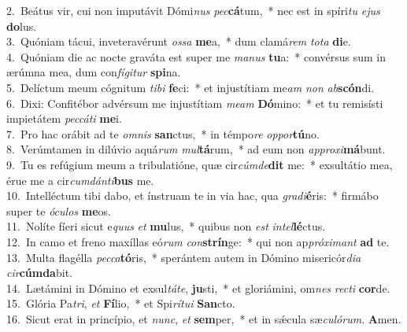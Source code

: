 {2.~}Beátus vir, cui non imputávit Dómi\textit{nus} \textit{pec}\textbf{cá}tum,~* nec est in spíri\textit{tu} \textit{e}\textit{jus} \textbf{do}lus.\\
{3.~}Quóniam tácui, inveteravérunt \textit{os}\textit{sa} \textbf{me}a,~* dum clamá\textit{rem} \textit{to}\textit{ta} \textbf{di}e.\\
{4.~}Quóniam die ac nocte graváta est super me \textit{ma}\textit{nus} \textbf{tu}a:~* convérsus sum in ærúmna mea, dum con\textit{fí}\textit{gi}\textit{tur} \textbf{spi}na.\\
{5.~}Delíctum meum cógnitum \textit{ti}\textit{bi} \textbf{fe}ci:~* et injustítiam me\textit{am} \textit{non} \textit{ab}\textbf{scón}di.\\
{6.~}Dixi: Confitébor advérsum me injustítiam \textit{me}\textit{am} \textbf{Dó}mino:~* et tu remisísti impietátem \textit{pec}\textit{cá}\textit{ti} \textbf{me}i.\\
{7.~}Pro hac orábit ad te \textit{om}\textit{nis} \textbf{san}ctus,~* in témpo\textit{re} \textit{op}\textit{por}\textbf{tú}no.\\
{8.~}Verúmtamen in dilúvio aquá\textit{rum} \textit{mul}\textbf{tá}rum,~* ad eum non \textit{ap}\textit{pro}\textit{xi}\textbf{má}bunt.\\
{9.~}Tu es refúgium meum a tribulatióne, quæ cir\textit{cúm}\textit{de}\textbf{dit} me:~* exsultátio mea, érue me a cir\textit{cum}\textit{dán}\textit{ti}\textbf{bus} me.\\
{10.~}Intelléctum tibi dabo, et ínstruam te in via hac, qua \textit{gra}\textit{di}\textbf{é}ris:~* firmábo super te \textit{ó}\textit{cu}\textit{los} \textbf{me}os.\\
{11.~}Nolíte fíeri sicut e\textit{quus} \textit{et} \textbf{mu}lus,~* quibus non \textit{est} \textit{in}\textit{tel}\textbf{lé}ctus.\\
{12.~}In camo et freno maxíllas eó\textit{rum} \textit{con}\textbf{strín}ge:~* qui non ap\textit{pró}\textit{xi}\textit{mant} \textbf{ad} te.\\
{13.~}Multa flagélla \textit{pec}\textit{ca}\textbf{tó}ris,~* sperántem autem in Dómino misericór\textit{di}\textit{a} \textit{cir}\textbf{cúm}\textbf{da}bit.\\
{14.~}Lætámini in Dómino et exsul\textit{tá}\textit{te}, \textbf{ju}sti,~* et gloriámini, om\textit{nes} \textit{re}\textit{cti} \textbf{cor}de.\\
{15.~}Glória Pa\textit{tri}, \textit{et} \textbf{Fí}lio,~* et Spi\textit{rí}\textit{tu}\textit{i} \textbf{San}cto.\\
{16.~}Sicut erat in princípio, et \textit{nunc}, \textit{et} \textbf{sem}per,~* et in sǽcula sæ\textit{cu}\textit{ló}\textit{rum}. \textbf{A}men.\\
